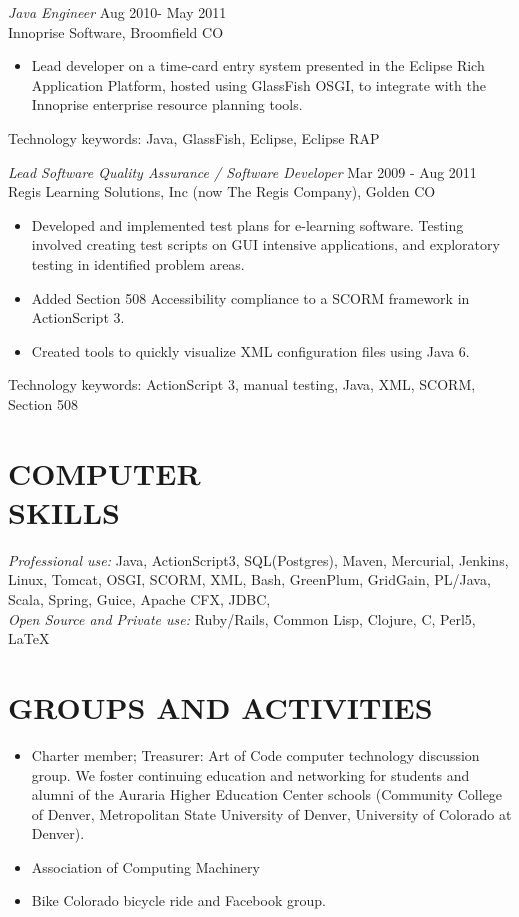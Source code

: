 \documentclass[line,margin]{res}
\begin{document}
\begin{resume}
 
                {\sl Java Engineer} \hfill          Aug 2010- May 2011 \\
                Innoprise Software, Broomfield CO
                 \begin{itemize}  \itemsep -2pt %
                 \item Lead developer on a time-card entry system presented in the Eclipse Rich Application Platform, hosted using GlassFish OSGI, to integrate with the
		Innoprise enterprise resource planning tools.
\end{itemize} 
	     Technology keywords: Java, GlassFish, Eclipse, Eclipse RAP
                

                {\sl Lead Software Quality Assurance / Software Developer} \hfill        Mar 2009 - Aug 2011 \\
                Regis Learning Solutions, Inc (now The Regis Company), Golden CO
                  \begin{itemize}  \itemsep -2pt %
                   \item Developed and implemented test plans for e-learning software. Testing involved creating test scripts on GUI intensive applications, and exploratory testing in identified problem areas.
		\item Added Section 508 Accessibility compliance to a SCORM framework in ActionScript 3.
		\item Created tools to quickly visualize XML configuration files using Java 6.   
    \end{itemize} 
		Technology keywords: ActionScript 3, manual testing, Java, XML, SCORM, Section 508
            
 \section{COMPUTER \\ SKILLS} {\sl Professional use:} Java, ActionScript3, SQL(Postgres), Maven, Mercurial, Jenkins, Linux, Tomcat, OSGI, SCORM, XML, Bash, GreenPlum, GridGain, PL/Java, Scala, Spring, Guice, Apache CFX, JDBC,  \\
                {\sl Open Source and Private use:} Ruby/Rails, Common Lisp, Clojure, C, Perl5, \LaTeX \\


\section{GROUPS AND ACTIVITIES}        
\begin{itemize}   \itemsep -2pt %
          \item Charter member; Treasurer: Art of Code computer technology discussion group. We foster continuing education and networking for students and alumni of the Auraria Higher Education Center schools (Community College of Denver, Metropolitan State University of Denver, University of Colorado at Denver).
\item	Association of Computing Machinery
\item Bike Colorado bicycle ride and Facebook group.
\end{itemize}
 

\end{resume}
\end{document}
